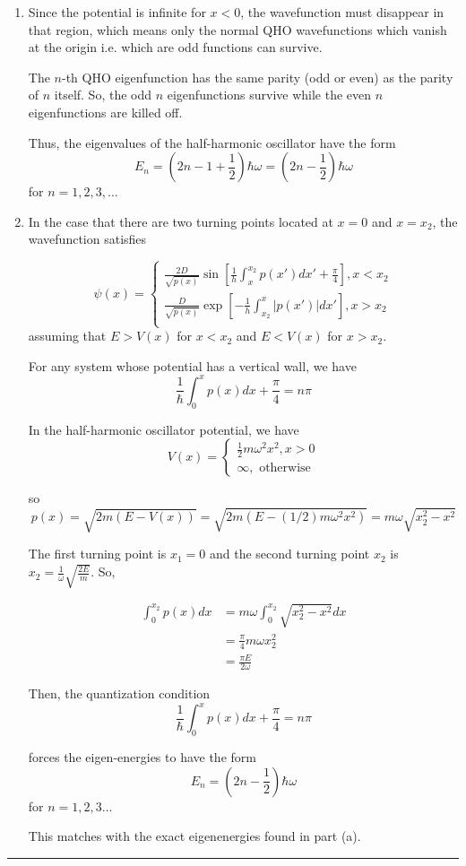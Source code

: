 \documentclass{article}
\begin{document}
\begin{enumerate}[label=(\alph*)]
  \item Since the potential is infinite for $x < 0$, the wavefunction must disappear in that region, which means only the normal QHO wavefunctions which vanish at the origin i.e. which are odd functions can survive. 
  
  \vskip 0.5cm
  The $n$-th QHO eigenfunction has the same parity (odd or even) as the parity of $n$ itself. So, the odd $n$ eigenfunctions survive while the even $n$ eigenfunctions are killed off. 

  \vskip 0.5cm
  Thus, the eigenvalues of the half-harmonic oscillator have the form
  \[ E_n = \left(2n - 1 + \frac{1}{2}\right)\hbar \omega = \left(2n - \frac{1}{2}\right)\hbar \omega \]
  for $n = 1,2,3,\dots$

  \item In the case that there are two turning points located at $x = 0$ and $x = x_2$, the wavefunction satisfies
  
  \[ \psi(x) = \begin{cases}
    \frac{2D}{\sqrt{p(x)}} \sin\left[\frac{1}{h} \int_x^{x_2}p(x')dx' + \frac{\pi}{4}  \right], x < x_2 \\
    \frac{D}{\sqrt{p(x)}} \exp\left[-\frac{1}{h} \int_{x_2}^{x}|p(x')|dx'  \right], x > x_2 \\
  \end{cases}  \]
  assuming that $E > V(x)$ for $x < x_2$ and $E < V(x)$ for $x > x_2$.

  For any system whose potential has a vertical wall, we have 
  \[ \frac{1}{\hbar} \int_{0}^{x} p(x)dx + \frac{\pi}{4} = n\pi  \]
  
  In the half-harmonic oscillator potential, we have 
  \[ V(x) = \begin{cases}
    \frac{1}{2}m\omega^2x^2, x > 0 \\
    \infty, \text{ otherwise}
  \end{cases}   \]

  so
  \[ p(x) = \sqrt{2m(E - V(x))} = \sqrt{2m(E - (1/2)m\omega^2x^2)} = m\omega \sqrt{x_2^2 - x^2} \]

  The first turning point is $x_1 = 0$ and the second turning point $x_2$ is $x_2 = \frac{1}{\omega}\sqrt{\frac{2E}{m}}$. So, 

  \begin{align*}
    \int_{0}^{x_2} p(x)dx &= m\omega \int_{0}^{x_2} \sqrt{x_2^2 - x^2} dx \\
    &= \frac{\pi}{4} m\omega x_2^2 \\
    &= \frac{\pi E}{2 \omega}
  \end{align*}
  
  Then, the quantization condition
  \[ \frac{1}{\hbar} \int_{0}^{x} p(x)dx + \frac{\pi}{4} = n\pi \]

  forces the eigen-energies to have the form 
  \[ E_n = \left(2n - \frac{1}{2}\right)\hbar \omega  \]
  for $n = 1,2,3\dots$

  This matches with the exact eigenenergies found in part (a).

\end{enumerate}


\vskip 0.5cm


\vskip 0.5cm 
\hrule 
\vskip 0.5cm
\end{document}
